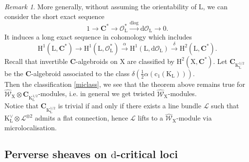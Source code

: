 \documentclass{article}
\theoremstyle{plain}
\theoremstyle{definition}
\theoremstyle{remark}
\newtheorem{remark}[theorem]{Remark}
\newcommand{\mr}{\mathrm}
\newcommand{\C}{\mathbf C}
\newcommand{\3}{\vspace{3mm}}
\newcommand{\2}{\vspace{2mm}}
\newcommand{\1}{\vspace{1mm}}
\begin{document}
\begin{remark}
 More generally, without assuming the orientability of $\mr{L}$, we can consider the short exact sequence $$1 \to \C^{*} \to \mathscr{O}_{\mr{L}}^{*} \xrightarrow{\mr{dlog}} \mr{d}\mathscr{O}_{\mr{L}}\to 0.$$ It induces a long exact sequence in cohomology which includes $$\mr{H}^{1}(\mr{L},\C^{*}) \to \mr{H}^1(\mr{L},\mathscr{O}_{\mr{L}}^{*}) \xrightarrow{\alpha} \mr{H}^{1}(\mr{L},\mr{d}\mathscr{O}_{\mr{L}}) \xrightarrow{\delta} \mr{H}^{2}(\mr{L},\C^{*}).$$
Recall that invertible $\C$-algebroids on $\mr{X}$ are classified by $\mr{H}^2(\mr{X},\C^*)$. Let $\C_{\mr{K}_\mr{L}^{1/2}}$ be the $\C$-algebroid associated to the class $\delta(\frac{1}{2}\alpha(\mr{c}_1(\mr{K}_\mr{L})))$.\\
Then the classification \cref{miclass}, we see that the theorem above remains true for $\widehat{\mathscr{W}}_\mr{X}\otimes \C_{\mr{K}_\mr{L}^{1/2}}$-modules, i.e. in general we get twisted $\widehat{\mathscr{W}}_\mr{X}$-modules.\\
Notice that $\C_{\mr{K}_\mr{L}^{1/2}}$ is trivial if and only if there exists a line bundle $\mathscr{L}$ such that $\mr{K}_\mr{L}^{\vee}\otimes \mathscr{L}^{\otimes 2}$ admits a flat connection, hence $\mathscr{L}$ lifts to a $\widehat{\mathscr{W}}_\mr{X}$-module via microlocalisation.
\end{remark}

\subsection{Perverse sheaves on \texorpdfstring{$\mr{d}$}--critical loci}
\end{document}
